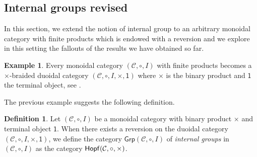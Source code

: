 \documentclass[nosumlimits,twoside]{amsart}
\theoremstyle{definition}
\newtheorem{definition}[definition]{\sc Definition}
\newtheorem{example}[example]{\sc Example}
\theoremstyle{remark}
\newcommand{\rd}[1]{{\color{red}{#1}}}
\newcommand{\as}[1]{{\color{blue}{#1}}}
\newcommand{\Cc}{\mathcal{C}}
\newcommand{\ot}{\otimes}
\def\cHopf{{\sf Hopf}_{\mathrm{coc}}}
\def\Grp{{\sf Grp}}
\def\Hopfmon{{\sf Hopf}}
\def\cHopfmon{{\sf Hopf}_{\mathrm{coc}}}
\def\cComon{{\sf Comon}_{\mathrm{coc}}}
\def\terminal{\mathsf{1}}
\begin{document}

\subsection{Internal groups revised} In this section, we extend the notion of internal group to an arbitrary monoidal category with finite products which is endowed with a reversion and we explore in this setting the fallouts of the results we have obtained so far.

\begin{example}
\label{exa:duoidfinprod}
Every monoidal category $(\Cc,\circ,I)$ with finite products becomes a $\times$-braided duoidal category $(\Cc,\circ,I,\times,\mathsf{1})$ where $\times$ is the binary product and $\mathsf{1}$ the terminal object, see \cite[Example 6.19 and Remark 6.21]{Aguiar}. %
\end{example}

The previous example suggests the following definition. 

\begin{definition}
    Let $(\Cc,\circ, I)$ be a monoidal category with binary product $\times$ and terminal object $\terminal$. When there exists a reversion on the duoidal category $(\Cc,\circ,I,\times,\terminal)$, we define the category $\mathsf{Grp}(\Cc,\circ,I)$ of \textit{internal groups} in $(\Cc,\circ, I)$ as the category $\Hopfmon(\Cc,\circ,\times)$.
\end{definition}
\end{document}
